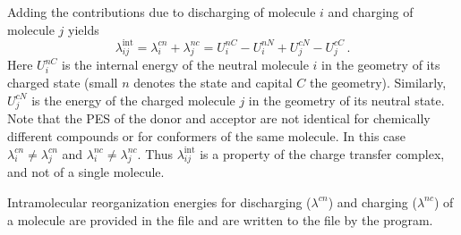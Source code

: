 Adding the contributions due to discharging of molecule $i$ and charging of molecule $j$ yields~\cite{bredas_charge-transfer_2004}
\begin{equation}
\lambda_{ij}^\text{int} =\lambda_{i}^{cn}+\lambda_{j}^{nc}=U_{i}^{nC}-U_{i}^{nN}+U_{j}^{cN}-U_{j}^{cC}\,.
\label{equ:lambdas}
\end{equation}
Here $U_{i}^{nC}$ is the internal energy of the neutral molecule $i$ in the geometry of its charged state (small $n$ denotes the state and capital $C$ the geometry). Similarly, $U_{j}^{cN}$ is the energy of the charged molecule $j$ in  the geometry of its neutral state.
%
Note that the PES of the donor and acceptor are not identical for chemically different compounds or for conformers of the same molecule. In this case $\lambda_{i}^{cn} \ne \lambda_{j}^{cn}$ and  $\lambda_{i}^{nc} \ne \lambda_{j}^{nc}$. Thus $\lambda_{ij}^\text{int}$ is a property of the charge transfer complex, and not of a single molecule.

Intramolecular reorganization energies for discharging ($\lambda^{cn}$) and charging ($\lambda^{nc}$) of a molecule are provided in the \xmlsegments file and are written to the \sqlstate file by the \ctpmap program. 

